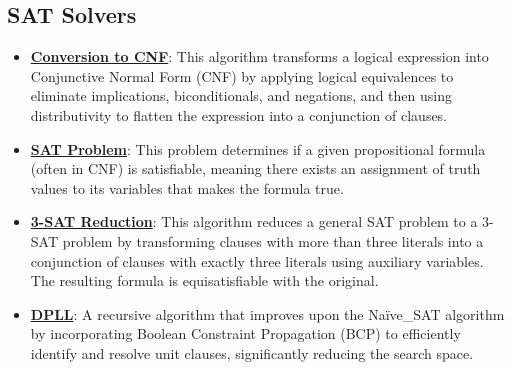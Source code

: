 \documentclass{article}%
\begin{document}
\subsection{SAT Solvers}%
\label{subsec:SATSolvers}%
\begin{itemize}[leftmargin=*]%
\item \href{https://purdue.brightspace.com/d2l/common/assets/pdfjs-d2l-dist/1.0.14-legacy/web/viewer.html?file=\%2Fcontent\%2Fenforced\%2F1095467-wl.202510.CS.24300.001\%2F13L1-Logic.pdf\%3Fou\%3D1095467\&lang=en-us\&container=d2l-fileviewer-rendered-pdf\&fullscreen=d2l-fileviewer-rendered-pdf-dialog\&height=667#page=17}{\textbf{Conversion to CNF}}: This algorithm transforms a logical expression into Conjunctive Normal Form (CNF) by applying logical equivalences to eliminate implications, biconditionals, and negations, and then using distributivity to flatten the expression into a conjunction of clauses.%
\item \href{https://purdue.brightspace.com/d2l/common/assets/pdfjs-d2l-dist/1.0.14-legacy/web/viewer.html?file=\%2Fcontent\%2Fenforced\%2F1095467-wl.202510.CS.24300.001\%2F13L1-Logic.pdf\%3Fou\%3D1095467\&lang=en-us\&container=d2l-fileviewer-rendered-pdf\&fullscreen=d2l-fileviewer-rendered-pdf-dialog\&height=667#page=15}{\textbf{SAT Problem}}: This problem determines if a given propositional formula (often in CNF) is satisfiable, meaning there exists an assignment of truth values to its variables that makes the formula true.%
\item \href{https://purdue.brightspace.com/d2l/common/assets/pdfjs-d2l-dist/1.0.14-legacy/web/viewer.html?file=\%2Fcontent\%2Fenforced\%2F1095467-wl.202510.CS.24300.001\%2F13L1-Logic.pdf\%3Fou\%3D1095467\&lang=en-us\&container=d2l-fileviewer-rendered-pdf\&fullscreen=d2l-fileviewer-rendered-pdf-dialog\&height=667#page=24}{\textbf{3-SAT Reduction}}: This algorithm reduces a general SAT problem to a 3-SAT problem by transforming clauses with more than three literals into a conjunction of clauses with exactly three literals using auxiliary variables. The resulting formula is equisatisfiable with the original.%
\item \href{https://purdue.brightspace.com/d2l/common/assets/pdfjs-d2l-dist/1.0.14-legacy/web/viewer.html?file=\%2Fcontent\%2Fenforced\%2F1095467-wl.202510.CS.24300.001\%2F15L2-SAT.pdf\%3Fou\%3D1095467\&lang=en-us\&container=d2l-fileviewer-rendered-pdf\&fullscreen=d2l-fileviewer-rendered-pdf-dialog\&height=667#page=17}{\textbf{DPLL}}: A recursive algorithm that improves upon the Naïve_SAT algorithm by incorporating Boolean Constraint Propagation (BCP) to efficiently identify and resolve unit clauses, significantly reducing the search space.%

\end{itemize}
\end{document}
